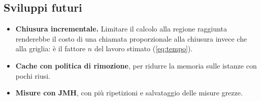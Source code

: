 \subsection{Sviluppi futuri}

\begin{itemize}
  \item \textbf{Chiusura incrementale.} Limitare il calcolo alla regione
        raggiunta renderebbe il costo di una chiamata proporzionale alla
        chiusura invece che alla griglia: è il fattore $n$ del lavoro stimato
        (\cref{eq:tempo}).
  \item \textbf{Cache con politica di rimozione}, per ridurre la memoria
        sulle istanze con pochi riusi.
  \item \textbf{Misure con JMH}, con più ripetizioni e salvataggio delle
        misure grezze.
\end{itemize}
